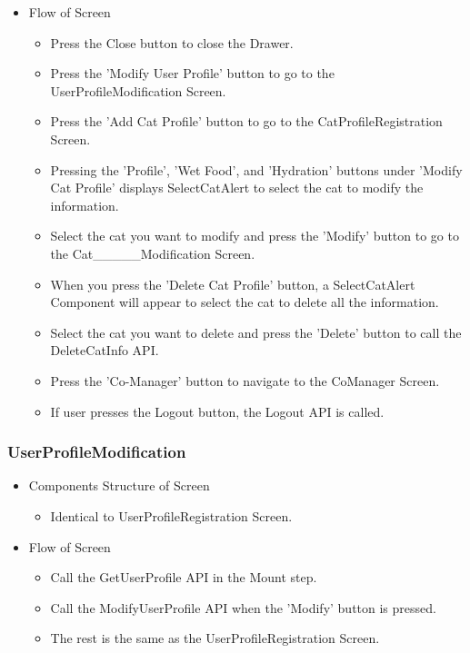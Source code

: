\documentclass[conference]{IEEEtran}
\begin{document}
\begin{itemize}
\begin{itemize}
\begin{itemize}
        \end{itemize}
    \end{itemize}
    \item Flow of Screen
    \begin{itemize}
        \item Press the Close button to close the Drawer.
        \item Press the 'Modify User Profile' button to go to the UserProfileModification Screen.
        \item Press the 'Add Cat Profile' button to go to the CatProfileRegistration Screen.
        \item Pressing the 'Profile', 'Wet Food', and 'Hydration' buttons under 'Modify Cat Profile' displays SelectCatAlert to select the cat to modify the information.
        \item Select the cat you want to modify and press the 'Modify' button to go to the Cat\_\_\_\_\_Modification Screen.
        \item When you press the 'Delete Cat Profile' button, a SelectCatAlert Component will appear to select the cat to delete all the information.
        \item Select the cat you want to delete and press the 'Delete' button to call the DeleteCatInfo API.
        \item Press the 'Co-Manager' button to navigate to the CoManager Screen.
        \item If user presses the Logout button, the Logout API is called.\\
    \end{itemize}
\end{itemize}

\subsubsection{UserProfileModification}
\begin{itemize}
    \item Components Structure of Screen
    \begin{itemize}
        \item Identical to UserProfileRegistration Screen.
    \end{itemize}
    \item Flow of Screen
    \begin{itemize}
        \item Call the GetUserProfile API in the Mount step.
        \item Call the ModifyUserProfile API when the 'Modify' button is pressed.
        \item The rest is the same as the UserProfileRegistration Screen.\\
    \end{itemize}
\end{itemize}
\end{document}
